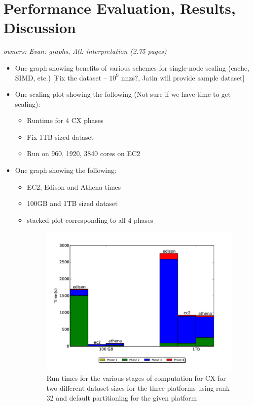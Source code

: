 
\section{Performance Evaluation, Results, Discussion}

\textit{owners: Evan: graphs, All: interpretation (2.75 pages)}
\begin{itemize}
  \item One graph showing benefits of various schemes for single-node scaling (cache, SIMD, etc.) [Fix the dataset -- $10^9$ nnzs?, Jatin will provide sample dataset]
  \item One scaling plot showing the following (Not sure if we have time to get scaling):
  \begin{itemize}
    \item Runtime for 4 CX phases
    \item Fix 1TB sized dataset
    \item Run on 960, 1920, 3840 cores on EC2  
  \end{itemize}

  \item One graph showing the following:
  \begin{itemize}
    \item EC2, Edison and Athena times
    \item 100GB and 1TB sized dataset
    \item stacked plot corresponding to all 4 phases
    \begin{figure} [h]
    \begin{centering}
    \includegraphics[scale=0.4]{images/CX_Size_Scaling}
    \end{centering}
    \caption{ Run times for the various stages of computation for CX for two different dataset sizes for the three platforms using rank 32 and default partitioning for the given platform} 
    \end{figure}
   

\end{itemize}
\end{itemize}
